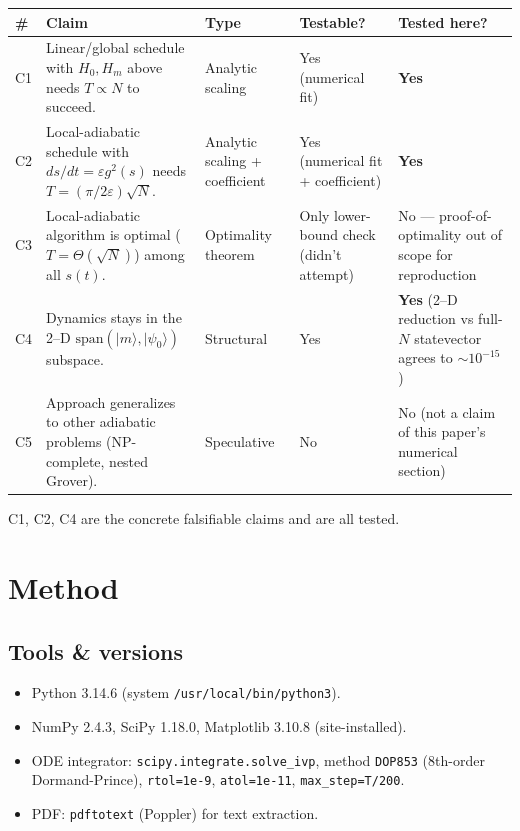 \documentclass[11pt]{article}
\begin{document}
\begin{center}\small
\begin{tabular}{p{0.5cm}p{7cm}p{2cm}p{2cm}p{3cm}}
\toprule
\# & Claim & Type & Testable? & Tested here? \\
\midrule
C1 & Linear/global schedule with $H_0,H_m$ above needs $T\propto N$ to succeed. & Analytic scaling & Yes (numerical fit) & \textbf{Yes} \\
C2 & Local-adiabatic schedule with $ds/dt=\varepsilon g^2(s)$ needs $T=(\pi/2\varepsilon)\sqrt N$. & Analytic scaling + coefficient & Yes (numerical fit + coefficient) & \textbf{Yes} \\
C3 & Local-adiabatic algorithm is optimal ($T=\Theta(\sqrt N)$) among all $s(t)$. & Optimality theorem & Only lower-bound check (didn't attempt) & No — proof-of-optimality out of scope for reproduction \\
C4 & Dynamics stays in the 2--D $\mathrm{span}(|m\rangle,|\psi_0\rangle)$ subspace. & Structural & Yes & \textbf{Yes} (2--D reduction vs full-$N$ statevector agrees to $\sim 10^{-15}$) \\
C5 & Approach generalizes to other adiabatic problems (NP-complete, nested Grover). & Speculative & No & No (not a claim of this paper's numerical section) \\
\bottomrule
\end{tabular}
\end{center}

C1, C2, C4 are the concrete falsifiable claims and are all tested.

\section{Method}

\subsection{Tools \& versions}
\begin{itemize}
\item Python 3.14.6 (system \texttt{/usr/local/bin/python3}).
\item NumPy 2.4.3, SciPy 1.18.0, Matplotlib 3.10.8 (site-installed).
\item ODE integrator: \texttt{scipy.integrate.solve\_ivp}, method \texttt{DOP853}
      (8th-order Dormand-Prince), \texttt{rtol=1e-9}, \texttt{atol=1e-11},
      \texttt{max\_step=T/200}.
\item PDF: \texttt{pdftotext} (Poppler) for text extraction.
\end{itemize}
\end{document}
